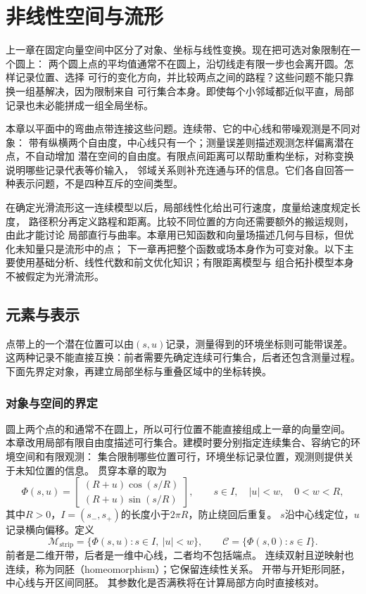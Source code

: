 \chapter{非线性空间与流形}
\label{chap:differential-geometry-and-symmetry}

上一章在固定向量空间中区分了对象、坐标与线性变换。现在把可选对象限制在一个圆上：
两个圆上点的平均值通常不在圆上，沿切线走有限一步也会离开圆。怎样记录位置、选择
可行的变化方向，并比较两点之间的路程？这些问题不能只靠换一组基解决，因为限制来自
可行集合本身。即使每个小邻域都近似平直，局部记录也未必能拼成一组全局坐标。

本章以平面中的弯曲点带连接这些问题。连续带、它的中心线和带噪观测是不同对象：
带有纵横两个自由度，中心线只有一个；测量误差则描述观测怎样偏离潜在点，不自动增加
潜在空间的自由度。有限点间距离可以帮助重构坐标，对称变换说明哪些记录代表等价输入，
邻域关系则补充连通与环的信息。它们各自回答一种表示问题，不是四种互斥的空间类型。

在确定光滑流形这一连续模型以后，局部线性化给出可行速度，度量给速度规定长度，
路径积分再定义路程和距离。比较不同位置的方向还需要额外的搬运规则，由此才能讨论
局部直行与曲率。本章用已知函数和向量场描述几何与目标，但优化未知量只是流形中的点；
下一章再把整个函数或场本身作为可变对象。以下主要使用基础分析、线性代数和前文优化知识；有限距离模型与
组合拓扑模型本身不被假定为光滑流形。

\section{元素与表示}
\label{sec:geometry-nonlinear-representations}

点带上的一个潜在位置可以由$(s,u)$记录，测量得到的环境坐标则可能带误差。
这两种记录不能直接互换：前者需要先确定连续可行集合，后者还包含测量过程。
下面先界定对象，再建立局部坐标与重叠区域中的坐标转换。

\subsection{对象与空间的界定}
\label{sec:geometry-objects}

圆上两个点的和通常不在圆上，所以可行位置不能直接组成上一章的向量空间。
本章改用局部有限自由度描述可行集合。建模时要分别指定连续集合、容纳它的环境空间和有限观测：
集合限制哪些位置可行，环境坐标记录位置，观测则提供关于未知位置的信息。
贯穿本章的取为
\begin{equation}
 \Phi(s,u)=
 \begin{bmatrix}
 (R+u)\cos(s/R)\\(R+u)\sin(s/R)
 \end{bmatrix},
 \qquad s\in I,\quad |u|<w,\quad 0<w<R,
 \label{eq:geometry-curved-strip-parameterization}
\end{equation}
其中$R>0$，$I=(s_-,s_+)$的长度小于$2\pi R$，防止绕回后重复。
$s$沿中心线定位，$u$记录横向偏移。定义
\[
 \mathcal M_{\mathrm{strip}}=\{\Phi(s,u):s\in I,\ |u|<w\},
 \qquad \mathcal C=\{\Phi(s,0):s\in I\}.
\]
前者是二维开带，后者是一维中心线，二者均不包括端点。
连续双射且逆映射也连续，称为同胚（homeomorphism）；它保留连续性关系。
开带与开矩形同胚，中心线与开区间同胚。
其参数化是否满秩将在计算局部方向时直接核对。

